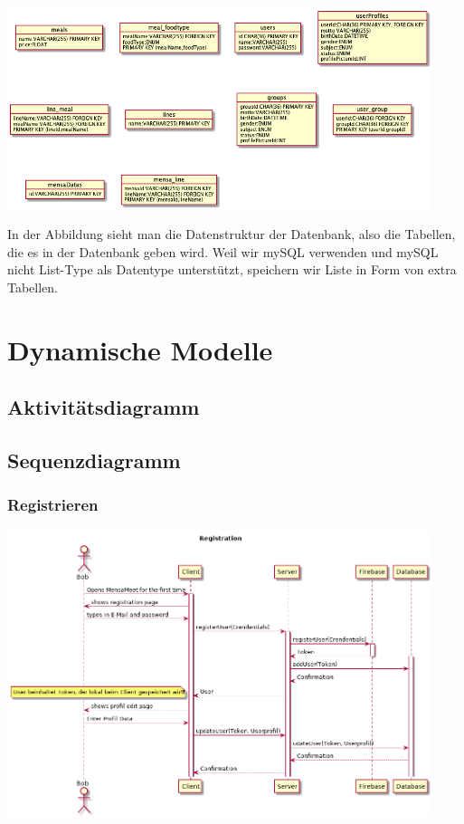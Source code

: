 \documentclass[a4paper]{scrreprt}
\begin{document}
\begin{center}
	\includegraphics[width=0.93\textwidth]{Objektdiagramme/datenstrukturen.png}
\end{center}
In der Abbildung sieht man die Datenstruktur der Datenbank, also die Tabellen, die es in der Datenbank geben wird. Weil wir mySQL verwenden und mySQL nicht List-Type als Datentype unterstützt, speichern wir Liste in Form von extra Tabellen.

\chapter{Dynamische Modelle}
\section{Aktivitätsdiagramm}

\section{Sequenzdiagramm}
\subsection{Registrieren}
\begin{center}
	\includegraphics[width=0.93\textwidth]{Sequenzdiagramme/Registration.png}
\end{center}
\end{document}
